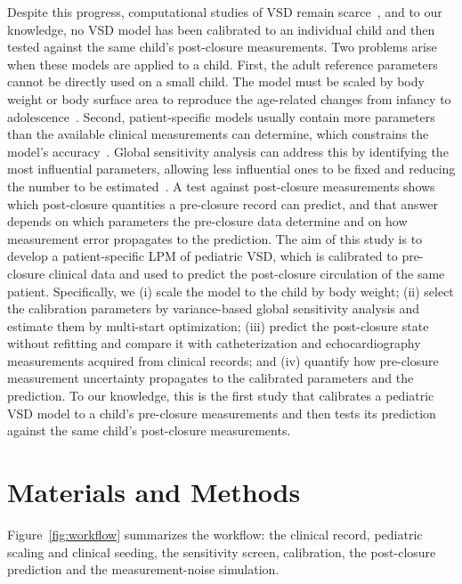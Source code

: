 \documentclass{article}
\begin{document}
Despite this progress, computational studies of VSD remain scarce~\cite{Colebank2026}, and to our knowledge, no VSD model has been calibrated to an individual child and then tested against the same child's post-closure measurements. Two problems arise when these models are applied to a child. First, the adult reference parameters cannot be directly used on a small child. The model must be scaled by body weight or body surface area to reproduce the age-related changes from infancy to adolescence~\cite{zhang2019multiscale,Lundquist2025}. Second, patient-specific models usually contain more parameters than the available clinical measurements can determine, which constrains the model's accuracy~\cite{Schiavazzi2017}. Global sensitivity analysis can address this by identifying the most influential parameters, allowing less influential ones to be fixed and reducing the number to be estimated~\cite{Saltelli2010,vanOsta2020}. A test against post-closure measurements shows which post-closure quantities a pre-closure record can predict, and that answer depends on which parameters the pre-closure data determine and on how measurement error propagates to the prediction. The aim of this study is to develop a patient-specific LPM of pediatric VSD, which is calibrated to pre-closure clinical data and used to predict the post-closure circulation of the same patient. Specifically, we (i) scale the model to the child by body weight; (ii) select the calibration parameters by variance-based global sensitivity analysis and estimate them by multi-start optimization; (iii) predict the post-closure state without refitting and compare it with catheterization and echocardiography measurements acquired from clinical records; and (iv) quantify how pre-closure measurement uncertainty propagates to the calibrated parameters and the prediction. To our knowledge, this is the first study that calibrates a pediatric VSD model to a child's pre-closure measurements and then tests its prediction against the same child's post-closure measurements.

\section{Materials and Methods}
\label{sec:methods}
Figure~\ref{fig:workflow} summarizes the workflow: the clinical record, pediatric scaling and clinical seeding, the sensitivity screen, calibration, the post-closure prediction and the measurement-noise simulation.
\end{document}
